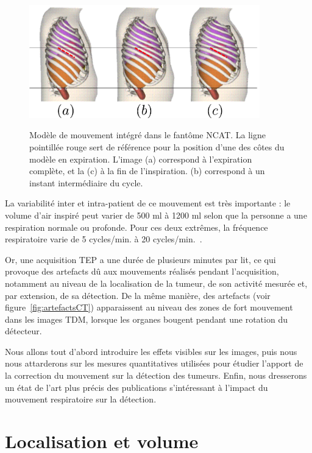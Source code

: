 \begin{figure}[h!]
    \begin{center}
            \includegraphics[width=10cm]{images/mvtRespi} \\
    \end{center}
    \caption[Modèle de mouvement intégré dans le fantôme NCAT]{Modèle de mouvement intégré dans le fantôme NCAT. La ligne pointillée rouge sert de référence pour la position d'une des côtes du modèle en expiration. L'image (a) correspond à l'expiration complète, et la (c) à la fin de l'inspiration. (b) correspond à un instant intermédiaire du cycle. }
    \label{fig:respiXCAT}
\end{figure}


La variabilité inter et intra-patient de ce mouvement est très importante : le volume d'air inspiré peut varier de 500 ml à 1200 ml selon que la personne a une respiration normale ou profonde. Pour ces deux extrêmes, la fréquence respiratoire varie de 5 cycles/min. à 20 cycles/min.~\cite{sherwood2006fundamentals}.

Or, une acquisition TEP a une durée de plusieurs minutes par lit, ce qui provoque des artefacts dû aux mouvements réalisés pendant l'acquisition, notamment au niveau de la localisation de la tumeur, de son activité mesurée et, par extension, de sa détection. De la même manière, des artefacts (voir figure~\ref{fig:artefactsCT}) apparaissent au niveau des zones de fort mouvement dans les images TDM, lorsque les organes bougent pendant une rotation du détecteur.

Nous allons tout d'abord introduire les effets visibles sur les images, puis nous nous attarderons sur les mesures quantitatives utilisées pour étudier l'apport de la correction du mouvement sur la détection des tumeurs. Enfin, nous dresserons un état de l'art plus précis des publications s'intéressant à l'impact du mouvement respiratoire sur la détection.

\section{Localisation et volume}


